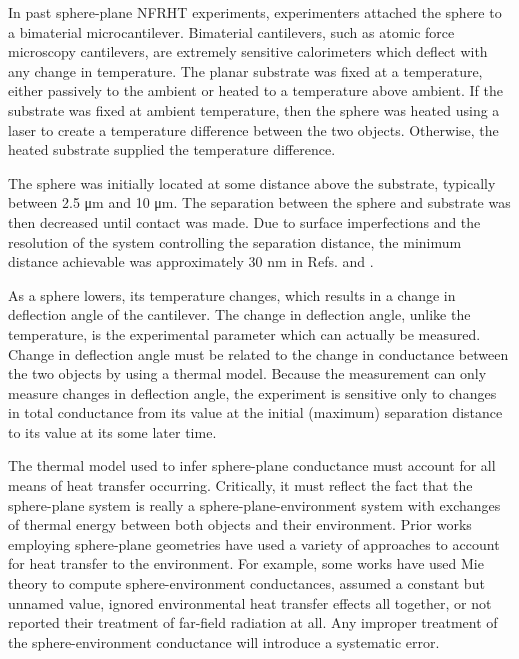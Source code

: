 In past sphere-plane NFRHT experiments,\cite{Rousseau2009,Shen2009} experimenters attached the sphere to a bimaterial microcantilever. Bimaterial cantilevers, such as atomic force microscopy cantilevers, are extremely sensitive calorimeters which deflect with any change in temperature. The planar substrate was fixed at a temperature, either passively to the ambient or heated to a temperature above ambient. If the substrate was fixed at ambient temperature, then the sphere was heated using a laser to create a temperature difference between the two objects. Otherwise, the heated substrate supplied the temperature difference.

The sphere was initially located at some distance above the substrate, typically between 2.5 \si{\micro\meter} and 10 \si{\micro\meter}. The separation between the sphere and substrate was then decreased until contact was made. Due to surface imperfections and the resolution of the system controlling the separation distance, the minimum distance achievable was approximately 30 \si{\nano\meter} in Refs.  and .

As a sphere lowers, its temperature changes, which results in a change in deflection angle of the cantilever. The change in deflection angle, unlike the temperature, is the experimental parameter which can actually be measured. Change in deflection angle must be related to the change in conductance between the two objects by using a thermal model. Because the measurement can only measure changes in deflection angle, the experiment is sensitive only to changes in total conductance from its value at the initial (maximum) separation distance to its value at its some later time.

The thermal model used to infer sphere-plane conductance must account for all means of heat transfer occurring. Critically, it must reflect the fact that the sphere-plane system is really a sphere-plane-environment system with exchanges of thermal energy between both objects and their environment. Prior works employing sphere-plane geometries have used a variety of approaches to account for heat transfer to the environment. For example, some works have used Mie theory to compute sphere-environment conductances,\cite{Narayanaswamy2008a} assumed a constant but unnamed value,\cite{Shen2009} ignored environmental heat transfer effects all together,\cite{Rousseau2009, Guha2012} or not reported their treatment of far-field radiation at all.\cite{Kim2015} Any improper treatment of the sphere-environment conductance will introduce a systematic error.

